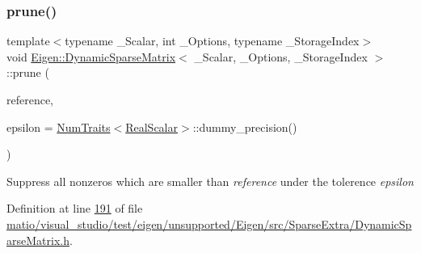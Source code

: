 \mbox{\label{class_eigen_1_1_dynamic_sparse_matrix_af3b38485a69d03e5c53d9ba57f9ce1d0}} 
\subsubsection{\texorpdfstring{prune()}{prune()}\hspace{0.1cm}{\footnotesize\ttfamily [2/2]}}
{\footnotesize\ttfamily template$<$typename \+\_\+\+Scalar, int \+\_\+\+Options, typename \+\_\+\+Storage\+Index$>$ \\
void \hyperlink{class_eigen_1_1_dynamic_sparse_matrix}{Eigen\+::\+Dynamic\+Sparse\+Matrix}$<$ \+\_\+\+Scalar, \+\_\+\+Options, \+\_\+\+Storage\+Index $>$\+::prune (\begin{DoxyParamCaption}\item[{Scalar}]{reference,  }\item[{\hyperlink{group___sparse_core___module_aaec8ace6efb785c81d442931c3248d88}{Real\+Scalar}}]{epsilon = {\ttfamily \hyperlink{group___core___module_struct_eigen_1_1_num_traits}{Num\+Traits}$<$\hyperlink{group___sparse_core___module_aaec8ace6efb785c81d442931c3248d88}{Real\+Scalar}$>$\+:\+:dummy\+\_\+precision()} }\end{DoxyParamCaption})\hspace{0.3cm}{\ttfamily [inline]}}

Suppress all nonzeros which are smaller than {\itshape reference} under the tolerence {\itshape epsilon} 

Definition at line \hyperlink{matio_2visual__studio_2test_2eigen_2unsupported_2_eigen_2src_2_sparse_extra_2_dynamic_sparse_matrix_8h_source_l00191}{191} of file \hyperlink{matio_2visual__studio_2test_2eigen_2unsupported_2_eigen_2src_2_sparse_extra_2_dynamic_sparse_matrix_8h_source}{matio/visual\+\_\+studio/test/eigen/unsupported/\+Eigen/src/\+Sparse\+Extra/\+Dynamic\+Sparse\+Matrix.\+h}.

\mbox{\label{class_eigen_1_1_dynamic_sparse_matrix_a2d793e836fdb4bf0a85c9cf390e07861}} 
